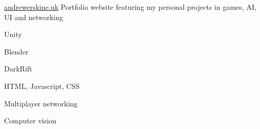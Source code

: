 

\begin{cventries}

  \cventry%
    {} %
    {\href{https://andrewerskine.uk}{andrewerskine.uk}} %
    {} %
    {} %
    {Portfolio website featuring my personal projects in games, AI, UI and networking}
    \begin{cventryskills}
      \item Unity
      \item Blender
      \item DarkRift
      \item HTML, Javascript, CSS
      \item Multiplayer networking
      \item Computer vision
    \end{cventryskills}

\end{cventries}

